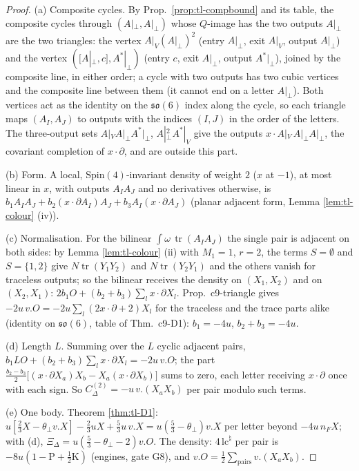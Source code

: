 \documentclass[11pt]{article}
\numberwithin{equation}{section}
\theoremstyle{plain}
\theoremstyle{definition}
\begin{document}
\begin{proof}
(a) Composite cycles. By Prop.~\ref{prop:tl-compbound} and its table, the composite cycles through $(A|_\perp,A|_\perp)$ whose $Q$-image has the two outputs $A|_\perp$ are the two triangles: the vertex $A|_V(A|_\perp)^2$ (entry $A|_\perp$, exit $A|_V$, output $A|_\perp$) and the vertex $([A|_\perp,c],A^*|_\perp)$ (entry $c$, exit $A|_\perp$, output $A^*|_\perp$), joined by the composite line, in either order; a cycle with two outputs has two cubic vertices and the composite line between them (it cannot end on a letter $A|_\perp$). Both vertices act as the identity on the $\mathfrak{so}(6)$ index along the cycle, so each triangle maps $(A_I,A_J)$ to outputs with the indices $(I,J)$ in the order of the letters. The three-output sets $A|_VA|_\perp A^*|_\perp$, $A|_\perp^2A^*|_V$ give the outputs $x\cdot A|_V\,A|_\perp A|_\perp$, the covariant completion of $x\cdot\partial$, and are outside this part.

(b) Form. A local, $\mathrm{Spin}(4)$-invariant density of weight $2$ ($x$ at $-1$), at most linear in $x$, with outputs $A_IA_J$ and no derivatives otherwise, is $b_1A_IA_J+b_2(x\cdot\partial A_I)A_J+b_3A_I(x\cdot\partial A_J)$ (planar adjacent form, Lemma \ref{lem:tl-colour} (iv)).

(c) Normalisation. For the bilinear $\int\omega\,\operatorname{tr}(A_IA_J)$ the single pair is adjacent on both sides: by Lemma \ref{lem:tl-colour} (ii) with $M_1=1$, $r=2$, the terms $S=\emptyset$ and $S=\{1,2\}$ give $N\operatorname{tr}(Y_1Y_2)$ and $N\operatorname{tr}(Y_2Y_1)$ and the others vanish for traceless outputs; so the bilinear receives the density on $(X_1,X_2)$ and on $(X_2,X_1)$: $2b_1O+(b_2+b_3)\sum_lx\cdot\partial X_l$. Prop.~c9-triangle gives $-2u\,v.O=-2u\sum_l(2x\cdot\partial+2)X_l$ for the traceless and the trace parts alike (identity on $\mathfrak{so}(6)$, table of Thm.~c9-D1): $b_1=-4u$, $b_2+b_3=-4u$.

(d) Length $L$. Summing over the $L$ cyclic adjacent pairs, $b_1LO+(b_2+b_3)\sum_lx\cdot\partial X_l=-2u\,v.O$; the part $\tfrac{b_2-b_3}2\big[(x\cdot\partial X_a)X_b-X_a(x\cdot\partial X_b)\big]$ sums to zero, each letter receiving $x\cdot\partial$ once with each sign. So $C^{(2)}_\Delta=-u\,v.(X_aX_b)$ per pair modulo such terms.

(e) One body. Theorem \ref{thm:tl-D1}: $u[\tfrac23X-\theta_\perp v.X]-\tfrac23uX+\tfrac53u\,v.X=u(\tfrac53-\theta_\perp)v.X$ per letter beyond $-4u\,n_F X$; with (d), $\Xi_\Delta=u(\tfrac53-\theta_\perp-2)v.O$. The density: $4\,\mathrm{lc}^\natural$ per pair is $-8u(1-\mathrm P+\tfrac12\mathrm K)$ (engines, gate G8), and $v.O=\tfrac12\sum_{\text{pairs}}v.(X_aX_b)$.


\end{proof}
\end{document}
